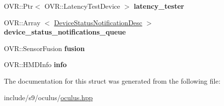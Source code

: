 \begin{DoxyCompactItemize}
\item 
\hypertarget{structs9_1_1oculus_1_1OculusBase_1_1SharedObj_aad1a82465b8b687132dca0e10c2fc1ea}{\-O\-V\-R\-::\-Ptr$<$ \-O\-V\-R\-::\-Latency\-Test\-Device $>$ {\bfseries latency\-\_\-tester}}\label{structs9_1_1oculus_1_1OculusBase_1_1SharedObj_aad1a82465b8b687132dca0e10c2fc1ea}

\item 
\hypertarget{structs9_1_1oculus_1_1OculusBase_1_1SharedObj_a81690a58a32b328c261f51471a88b4e9}{\-O\-V\-R\-::\-Array\*
$<$ \hyperlink{structs9_1_1oculus_1_1OculusBase_1_1DeviceStatusNotificationDesc}{\-Device\-Status\-Notification\-Desc} $>$ {\bfseries device\-\_\-status\-\_\-notifications\-\_\-queue}}\label{structs9_1_1oculus_1_1OculusBase_1_1SharedObj_a81690a58a32b328c261f51471a88b4e9}

\item 
\hypertarget{structs9_1_1oculus_1_1OculusBase_1_1SharedObj_a6df5dd9c6d509aa149332f70981d9b46}{\-O\-V\-R\-::\-Sensor\-Fusion {\bfseries fusion}}\label{structs9_1_1oculus_1_1OculusBase_1_1SharedObj_a6df5dd9c6d509aa149332f70981d9b46}

\item 
\hypertarget{structs9_1_1oculus_1_1OculusBase_1_1SharedObj_a9f9a6cc4a03cbec4c424eebed591e9b2}{\-O\-V\-R\-::\-H\-M\-D\-Info {\bfseries info}}\label{structs9_1_1oculus_1_1OculusBase_1_1SharedObj_a9f9a6cc4a03cbec4c424eebed591e9b2}

\end{DoxyCompactItemize}


\-The documentation for this struct was generated from the following file\-:\begin{DoxyCompactItemize}
\item 
include/s9/oculus/\hyperlink{oculus_8hpp}{oculus.\-hpp}\end{DoxyCompactItemize}
